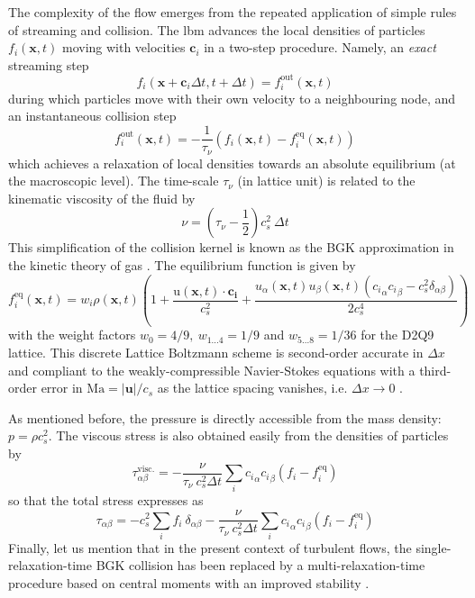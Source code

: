 \documentclass{jfm}
\newcommand{\EL}[1]{{\color{myred}{#1}}}
\begin{document}
%
The complexity of the flow emerges from the repeated application of simple rules of streaming and collision. The \ac{lbm} advances the local densities of particles $f_i(\mathbf{x},t)$ moving with velocities $\mathbf{c}_i$  in a two-step procedure. Namely, an \emph{exact} streaming step
\[
f_i(\mathbf{x}+\mathbf{c}_i \Delta t, t + \Delta t) = f_i^{\mathrm{out}}(\mathbf{x},t)
\]
during which particles move with their own velocity to a neighbouring node, and an instantaneous collision step
\[
f_i^{\mathrm{out}}(\mathbf{x},t) = -\frac 1 {\tau_\nu} \left(f_i(\mathbf{x},t) - f_i^\mathrm{eq}(\mathbf{x},t) \right)
\]
which achieves a relaxation of local densities towards an absolute equilibrium (at the macroscopic level). The time-scale $\tau_\nu$ (in lattice unit) is related to the kinematic viscosity of the fluid by
\[
\nu = \left( {\tau_\nu} - \frac 1 2 \right) c_s^2 ~\Delta t
\]
This simplification of the collision kernel is known as the BGK approximation in the kinetic theory of gas \EL{\citep{BGK}}.
%
The equilibrium function is given by
\[
f_i^\mathrm{eq}(\mathbf{x},t) = w_i  \rho(\mathbf{x},t) \left( 1 + \frac{\mathrm u(\mathbf{x},t) \cdot \mathbf{c_i}}{c_s^2} +
\frac{u_\alpha(\mathbf{x},t) u_\beta(\mathbf{x},t)({c_i}_\alpha {c_i}_\beta - c_s^2 \delta_{\alpha\beta})}{2 c_s^4} \right)
\]
with the weight factors $w_0=4/9,~w_{1...4} = 1/9$ and $w_{5...8}=1/36$ for the D2Q9 lattice.
This discrete Lattice Boltzmann scheme is second-order accurate in $\Delta x $ and compliant to the weakly-compressible Navier-Stokes equations with a third-order error in $\mathrm{Ma}=|\mathbf{u}|/c_s$ as the lattice spacing vanishes, i.e. $\Delta x \to 0$ \EL{\citep{succi_book}}.

As mentioned before, the pressure is directly accessible from the mass density: $p = \rho c_s^2$. The viscous stress is also obtained easily from the densities of particles by
\[
\tau^\mathrm{visc.}_{\alpha \beta} = -\frac{\nu}{\tau_\nu ~ c_s^2 \Delta t} \sum_i  {c_i}_\alpha {c_i}_\beta (f_i - f_i^\mathrm{eq})
\]
so that the total stress expresses as
\begin{equation}\label{eq:def_stress}
\tau_{\alpha \beta} = -  c_s^2 \sum_i f_i ~ \delta_{\alpha\beta}  - \frac{\nu}{\tau_\nu ~ c_s^2 \Delta t} \sum_i  {c_i}_\alpha {c_i}_\beta (f_i - f_i^\mathrm{eq})
\end{equation}
Finally, let us mention that in the present context of turbulent flows, the single-relaxation-time BGK collision has been replaced by a multi-relaxation-time procedure based on central moments with an improved stability \citep{De_Rosis_2016}.
\end{document}
